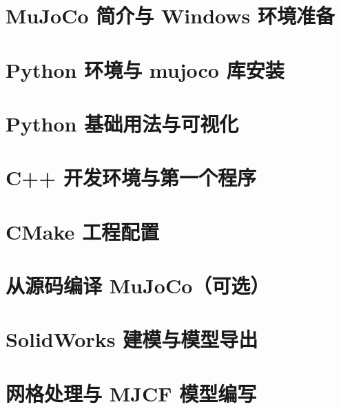 \documentclass[12pt,a4paper,openany]{ctexbook}
\begin{document}
	

	\newpage

	\pagestyle{plain}

	\setcounter{tocdepth}{2}
	\tableofcontents

	\setcounter{page}{0}
	\thispagestyle{empty}
	\newpage

	\chapter{MuJoCo 简介与 Windows 环境准备}
	

	\chapter{Python 环境与 mujoco 库安装}
	

	\chapter{Python 基础用法与可视化}
	

	\chapter{C++ 开发环境与第一个程序}
	

	\chapter{CMake 工程配置}
	

	\chapter{从源码编译 MuJoCo（可选）}
	

	\chapter{SolidWorks 建模与模型导出}
	

	\chapter{网格处理与 MJCF 模型编写}
	
\end{document}
